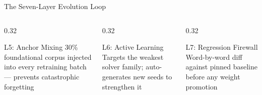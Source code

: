 \documentclass[aspectratio=169,10pt]{beamer}
\begin{document}
\begin{frame}{The Seven-Layer Evolution Loop}
\begin{center}
  \end{center}
  \vspace{-4pt}
  \begin{columns}
    \begin{column}{0.32\textwidth}
      \begin{block}{\footnotesize\color{autoGreen} L5: Anchor Mixing}
        \scriptsize 30\% foundational corpus injected into every retraining batch — prevents catastrophic forgetting
      \end{block}
    \end{column}
    \begin{column}{0.32\textwidth}
      \begin{block}{\footnotesize\color{autoOrange} L6: Active Learning}
        \scriptsize Targets the weakest solver family; auto-generates new seeds to strengthen it
      \end{block}
    \end{column}
    \begin{column}{0.32\textwidth}
      \begin{block}{\footnotesize L7: Regression Firewall}
        \scriptsize Word-by-word diff against pinned baseline before any weight promotion
      \end{block}
    \end{column}
  \end{columns}
\end{frame}
\end{document}
